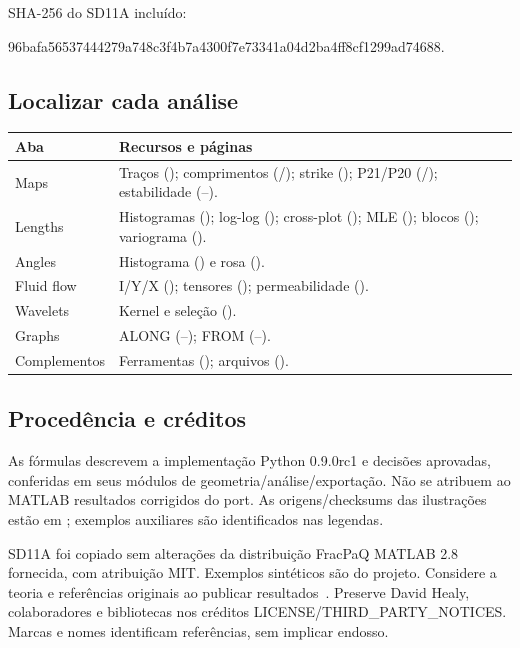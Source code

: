 SHA-256 do SD11A incluído:\par
{\small\ttfamily 96bafa56537444279a748c3f4b7a4300f7e7\allowbreak 3341a04d2ba4ff8cf1299ad74688.}

\subsection{Localizar cada análise}
\begin{longtable}{@{}p{.23\linewidth}p{.69\linewidth}@{}}
\toprule Aba & Recursos e páginas\\\midrule\endhead
Maps & Traços (\pageref{feat:MAP-01}); comprimentos (\pageref{feat:MAP-04}/\pageref{feat:MAP-05}); strike (\pageref{feat:MAP-06}); P21/P20 (\pageref{feat:MAP-07}/\pageref{feat:MAP-08}); estabilidade (\pageref{feat:MAP-11}--\pageref{feat:MAP-14}).\\
Lengths & Histogramas (\pageref{feat:LEN-02}); log-log (\pageref{feat:LEN-03}); cross-plot (\pageref{feat:LEN-06}); MLE (\pageref{feat:LEN-07}); blocos (\pageref{feat:LEN-13}); variograma (\pageref{feat:LEN-15}).\\
Angles & Histograma (\pageref{feat:ANG-01}) e rosa (\pageref{feat:ANG-02}).\\
Fluid flow & I/Y/X (\pageref{feat:FLO-01}); tensores (\pageref{feat:FLO-08}); permeabilidade (\pageref{feat:FLO-09}).\\
Wavelets & Kernel e seleção (\pageref{feat:WAV-01}).\\
Graphs & ALONG (\pageref{feat:GRA-03}--\pageref{feat:GRA-07}); FROM (\pageref{feat:GRA-10}--\pageref{feat:GRA-12}).\\
Complementos & Ferramentas (\pageref{sec:aux}); arquivos (\pageref{sec:exports}).\\\bottomrule
\end{longtable}

\subsection{Procedência e créditos}
As fórmulas descrevem a implementação Python 0.9.0rc1 e decisões aprovadas, conferidas em seus módulos de geometria/análise/exportação. Não se atribuem ao MATLAB resultados corrigidos do port. As origens/checksums das ilustrações estão em ; exemplos auxiliares são identificados nas legendas.

SD11A foi copiado sem alterações da distribuição FracPaQ MATLAB 2.8 fornecida, com atribuição MIT. Exemplos sintéticos são do projeto. Considere a teoria e referências originais ao publicar resultados~\cite{healy}. Preserve David Healy, colaboradores e bibliotecas nos créditos LICENSE/THIRD\_PARTY\_NOTICES. Marcas e nomes identificam referências, sem implicar endosso.

